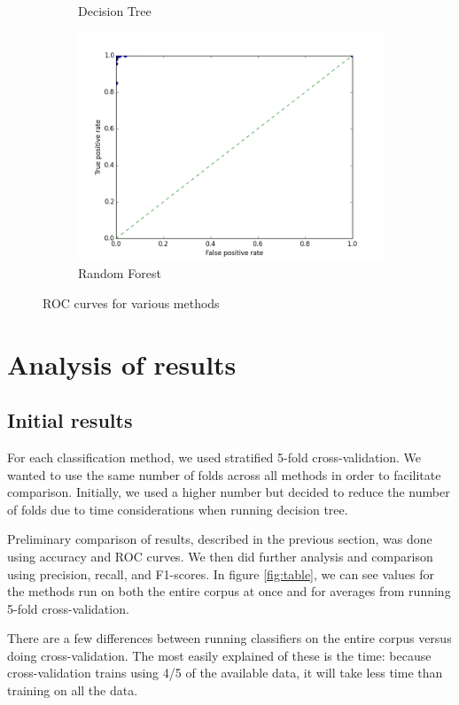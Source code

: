 \documentclass{article} %
\begin{document}
\begin{figure}[h]
\begin{subfigure}{0.45\textwidth}
    \caption{Decision Tree}
  \end{subfigure}
  \begin{subfigure}{0.45\textwidth}
    \includegraphics[width=\textwidth]{random_forest_roc_curve.png}
    \caption{Random Forest}
  \end{subfigure}
  \caption{ROC curves for various methods}
  \label{fig:roc}
\end{figure}

\section{Analysis of results}
\subsection{Initial results}
For each classification method, we used stratified 5-fold cross-validation. We wanted to use the same number of folds across all methods in order to facilitate comparison. Initially, we used a higher number but decided to reduce the number of folds due to time considerations when running decision tree. 

Preliminary comparison of results, described in the previous section, was done using accuracy and ROC curves. We then did further analysis and comparison using precision, recall, and F1-scores. In figure \ref{fig:table}, we can see values for the methods run on both the entire corpus at once and for averages from running 5-fold cross-validation. 

There are a few differences between running classifiers on the entire corpus versus doing cross-validation. The most easily explained of these is the time: because cross-validation trains using 4/5 of the available data, it will take less time than training on all the data. 
\end{document}
